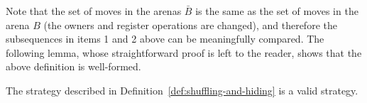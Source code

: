 \documentclass[10pt,a4paper]{amsart}
\numberwithin{equation}{section}
\theoremstyle{plain}
\begin{document}
Note that the set of moves in the arenas $\bar B$ is the same as the set of moves in the arena $B$ (the owners and register operations are changed),  and therefore the subsequences in items 1 and 2 above can be meaningfully compared.  The following lemma, whose straightforward proof is left to the reader,  shows that the above definition is well-formed.


\begin{lemma}
    The strategy described in Definition~\ref{def:shuffling-and-hiding} is a valid strategy.
\end{lemma}

\end{document}

